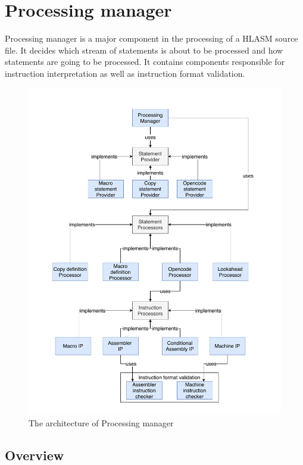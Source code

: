 \section{Processing manager}
\label{chap:process}

Processing manager is a major component in the processing of a HLASM source file. It decides which stream of statements is about to be processed and how statements are going to be processed. It contains components responsible for instruction interpretation as well as instruction format validation. 

\begin{figure}
	\centering
	\includegraphics[width=\textwidth]{img/processing_manager_arch}
	\caption{The architecture of Processing manager}
	\label{fig06:proc_mngr}
\end{figure}

\subsection{Overview}

